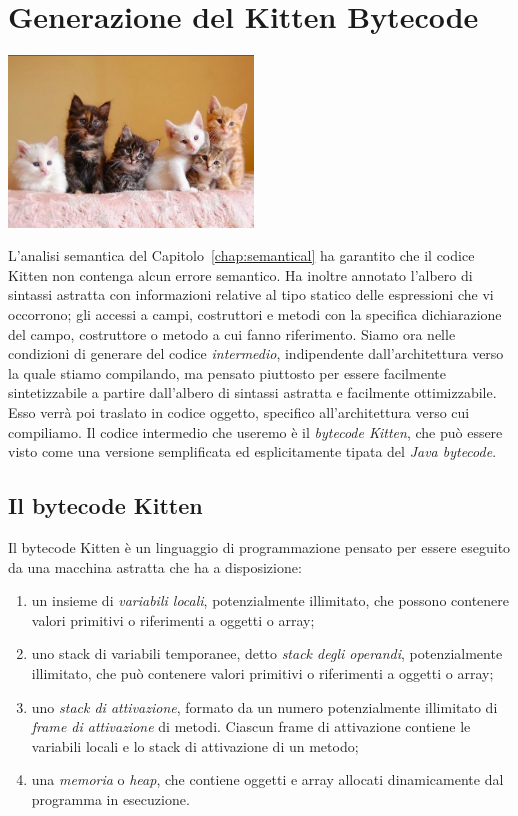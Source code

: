 \chapter{Generazione del Kitten Bytecode}\label{chap:translate}
%
\vspace*{-2ex}
\begin{center}
\includegraphics[width=6.5cm]{cat9.jpg}
\end{center}
%
L'analisi semantica del Capitolo~\ref{chap:semantical} ha garantito che
il codice Kitten non contenga alcun errore semantico. Ha inoltre
annotato l'albero di sintassi astratta con informazioni relative
al tipo statico delle espressioni che vi occorrono; gli accessi a
campi, costruttori e metodi con la specifica dichiarazione
del campo, costruttore
o metodo a cui fanno riferimento. Siamo ora nelle condizioni di
generare del codice \emph{intermedio}, \cioe indipendente dall'architettura
verso la quale stiamo compilando, ma pensato piuttosto per essere
facilmente sintetizzabile a partire dall'albero di sintassi astratta
e facilmente ottimizzabile. Esso verr\`a poi traslato in codice oggetto,
specifico all'architettura verso cui compiliamo.
Il codice intermedio che useremo \`e il \emph{bytecode Kitten}, che pu\`o
essere visto come una versione semplificata ed esplicitamente tipata del
\emph{Java bytecode}.
%
\section{Il bytecode Kitten}
%
Il bytecode Kitten \`e un linguaggio di programmazione pensato per
essere eseguito da una macchina astratta che ha a disposizione:
%
\begin{enumerate}
\item un insieme di \emph{variabili locali}, potenzialmente illimitato, che
      possono contenere valori primitivi o riferimenti a oggetti o array;
\item uno stack di variabili temporanee, detto \emph{stack degli operandi},
      potenzialmente illimitato, che pu\`o contenere valori primitivi o
      riferimenti a oggetti o array;
\item uno \emph{stack di attivazione}, formato da un numero potenzialmente
      illimitato di \emph{frame di attivazione} di metodi. Ciascun frame
      di attivazione contiene le variabili locali e lo stack di attivazione
      di un metodo;
\item una \emph{memoria} o \emph{heap}, che contiene oggetti e array
      allocati dinamicamente dal programma in esecuzione.
\end{enumerate}

